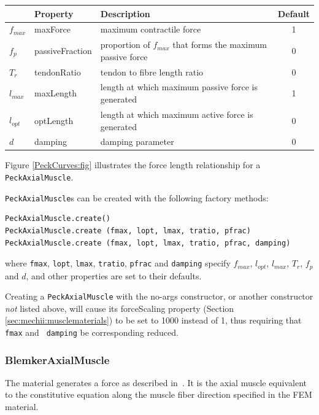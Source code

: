 \begin{center}
\begin{tabular}{|l|l|l|c|} \hline
 & Property & Description & Default \\
\hline
$f_{max}$ & {\sf maxForce} & maximum contractile force & 1 \\
$f_{p}$ & {\sf passiveFraction} & 
proportion of $f_{max}$ that forms the maximum passive force & 0 \\
$T_r$ & {\sf tendonRatio} & tendon to fibre length ratio & 0 \\
$l_{max}$ & {\sf maxLength} & 
length at which maximum passive force is generated & 1 \\
$l_{opt}$ & {\sf optLength} & 
length at which maximum active force is generated & 0 \\
$d$ & {\sf damping} & damping parameter & 0 \\ 
\hline
\end{tabular}
\end{center}

Figure \ref{PeckCurves:fig} illustrates the force length relationship
for a {\tt PeckAxialMuscle}. 

{\tt PeckAxialMuscle}s can be created with the following factory
methods:
\begin{lstlisting}[]
PeckAxialMuscle.create()
PeckAxialMuscle.create (fmax, lopt, lmax, tratio, pfrac)
PeckAxialMuscle.create (fmax, lopt, lmax, tratio, pfrac, damping)
\end{lstlisting}
%
where {\tt fmax}, {\tt lopt}, {\tt lmax}, {\tt tratio}, {\tt pfrac}
and {\tt damping} specify $f_{max}$, $l_{opt}$, $l_{max}$, $T_r$,
$f_{p}$ and $d$, and other properties are set to their defaults.

\begin{sideblock}
Creating a {\tt PeckAxialMuscle} with the no-args constructor, or
another constructor {\it not} listed above, will cause its {\sf
forceScaling} property (Section \ref{sec:mechii:musclematerials}) to
be set to 1000 instead of 1, thus requiring that {\tt fmax} and {\tt
damping} be corresponding reduced.
\end{sideblock}

\subsubsection{BlemkerAxialMuscle}

The  material
generates a force as described in~\cite{blemker:2005:muscle}. It is
the axial muscle equivalent to the constitutive equation along the
muscle fiber direction specified in the
 FEM material.


